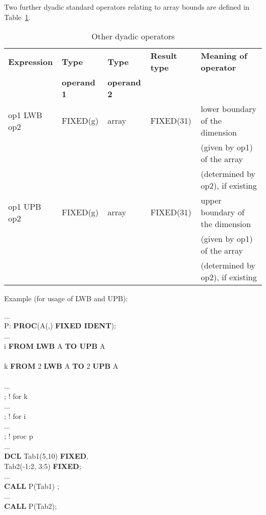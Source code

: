 Two further dyadic standard operators relating to array bounds are defined in Table~\ref{tab_dyadic_other}.

\begin{table} %
\begin{center}
\caption{Other dyadic operators}
\label{tab_dyadic_other}
\vspace{5mm}
\begin{tabular}{|l|l|l|l|l|}
\hline
{\bf Expression} & {\bf Type}      & {\bf Type}      & {\bf Result type} & {\bf Meaning of operator}\\
                 & {\bf operand 1} & {\bf operand 2} &                   & \\ \hline

op1 LWB op2
\index{LWB@\textbf{LWB}|textbf}
      & FIXED(g)        & array           & FIXED(31)         & lower boundary of the dimension\\
                 &                 &                 &                   & (given by op1) of the array\\
                 &                 &                 &                   & (determined by op2), if existing\\ \hline

op1 UPB op2
\index{UPB@\textbf{UPB}|textbf}
      & FIXED(g)        & array           & FIXED(31)         & upper boundary of the dimension\\
                 &                 &                 &                   & (given by op1) of the array\\
                 &                 &                 &                   & (determined by op2), if existing\\ 
\hline
\end{tabular}
\end{center}
\end{table}

\newpage
Example (for usage of LWB and UPB):

...\\
P: {\bf PROC}(A(,) {\bf FIXED IDENT});\\
\x ... \\
 i {\bf FROM LWB} A {\bf TO UPB} A\\
\x {} \\
\x \x {} k {\bf FROM} 2 {\bf LWB} A {\bf TO} 2 {\bf UPB} A \\
\x \x \x {} \\
\x \x \x \x \x ...\\
\x \x \x {}; ! for k\\
\x \x ... \\
\x {}; ! for i\\
\x ...\\
; ! proc p \\
...\\
{\bf DCL} Tab1(5,10) {\bf FIXED},\\
\x Tab2(-1:2, 3:5) {\bf FIXED};\\
... \\
{\bf CALL} P(Tab1) ;\\
...\\
{\bf CALL} P(Tab2);

